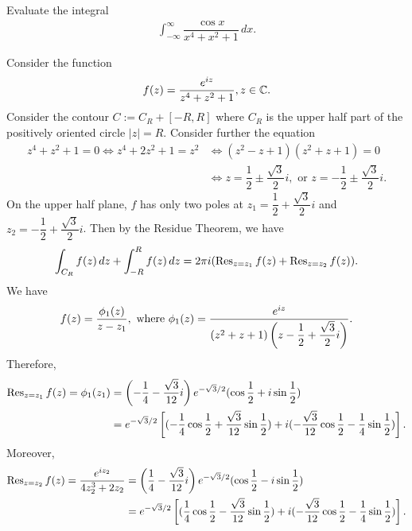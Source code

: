 \begin{problem}
Evaluate the integral 
\begin{align*}
    \int_{-\infty}^\infty \dfrac{\cos x}{x^4 + x^2 + 1} \,dx.
\end{align*}
\begin{solution}
Consider the function
    \begin{align*}
        f(z) = \dfrac{e^{iz}}{z^4+z^2+1}, z \in \mathbb{C}.
    \end{align*}
    Consider the contour $C := C_R + [-R,R]$ where $C_R$ is the upper half part of  the positively oriented circle $|z| = R$.
    Consider further the equation
    \begin{align*}
        z^4+z^2+1=0 \iff z^4+2z^2+1=z^2 &\iff (z^2-z+1)(z^2+z+1) = 0 \\
        &\iff z = \dfrac{1}{2} \pm \dfrac{\sqrt{3}}{2}i, \text{ or } z = -\dfrac{1}{2} \pm \dfrac{\sqrt{3}}{2}i.
    \end{align*}
    On the upper half plane, $f$ has only two poles at $z_1 = \dfrac{1}{2} + \dfrac{\sqrt{3}}{2}i$ and $z_2 = -\dfrac{1}{2} + \dfrac{\sqrt{3}}{2}i$. Then by the Residue Theorem, we have 
    \begin{align*}
        \int_{C_R} f(z) \,dz + \int_{-R}^R f(z) \,dz = 2\pi i (\operatorname{Res}_{z = z_1} f(z) + \operatorname{Res}_{z = z_2} f(z)).
    \end{align*}
    We have 
    \begin{align*}
        f(z) = \dfrac{\phi_1(z)}{z - z_1}, \text{ where } \phi_1(z) = \dfrac{e^{iz}}{(z^2 + z + 1)\left( z - \dfrac{1}{2} + \dfrac{\sqrt{3}}{2}i\right)}.
    \end{align*}
    Therefore,
    \begin{align*}
        \operatorname{Res}_{z = z_1} f(z) = \phi_1(z_1)&=\left( -\dfrac{1}{4}-\dfrac{\sqrt{3}}{12}i\right)e^{-\sqrt{3}/2}(\cos\dfrac{1}{2}+i\sin\dfrac{1}{2})\\
        &=e^{-\sqrt{3}/2}\left[ (-\dfrac{1}{4}\cos\dfrac{1}{2}+\dfrac{\sqrt{3}}{12}\sin \dfrac{1}{2})+i(-\dfrac{\sqrt{3}}{12}\cos\dfrac{1}{2}-\dfrac{1}{4}\sin\dfrac{1}{2})\right].
    \end{align*}
    Moreover, 
    \begin{align*}
        \Res_{z = z_2} f(z) =\dfrac{e^{iz_2}}{4z_2^3+2z_2}&=\brac{\dfrac{1}{4}-\dfrac{\sqrt{3}}{12}i}e^{-\sqrt{3}/2}(\cos\dfrac{1}{2}-i\sin\dfrac{1}{2})\\
        &=e^{-\sqrt{3}/2}\sbrac{(\dfrac{1}{4}\cos\dfrac{1}{2}-\dfrac{\sqrt{3}}{12}\sin \dfrac{1}{2})+i(-\dfrac{\sqrt{3}}{12}\cos\dfrac{1}{2}-\dfrac{1}{4}\sin\dfrac{1}{2})}.

\end{align*}
\end{solution}
\end{problem}
